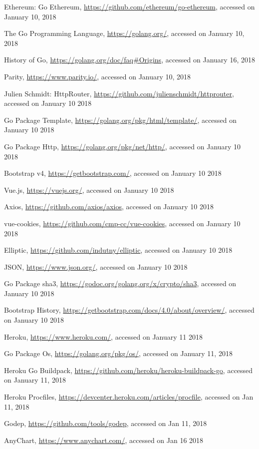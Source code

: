 \begin{thebibliography}{99}
 Ethereum: Go Ethereum, \url{https://github.com/ethereum/go-ethereum}, accessed on January 10, 2018

 The Go Programming Language, \url{https://golang.org/}, accessed on January 10, 2018

 History of Go, \url{https://golang.org/doc/faq#Origins}, accessed on January 16, 2018

 Parity, \url{https://www.parity.io/}, accessed on January 10, 2018

 Julien Schmidt: HttpRouter, \url{https://github.com/julienschmidt/httprouter}, accessed on January 10 2018

 Go Package Template, \url{https://golang.org/pkg/html/template/}, accessed on January 10 2018

 Go Package Http, \url{https://golang.org/pkg/net/http/}, accessed on January 10 2018

 Bootstrap v4, \url{https://getbootstrap.com/}, accessed on January 10 2018

 Vue.js, \url{https://vuejs.org/}, accessed on January 10 2018

 Axios, \url{https://github.com/axios/axios}, accessed on January 10 2018

 vue-cookies, \url{https://github.com/cmp-cc/vue-cookies}, accessed on January 10 2018

 Elliptic, \url{https://github.com/indutny/elliptic}, accessed on January 10 2018

 JSON, \url{https://www.json.org/}, accessed on January 10 2018

 Go Package sha3, \url{https://godoc.org/golang.org/x/crypto/sha3}, accessed on January 10 2018

 Bootstrap History, \url{https://getbootstrap.com/docs/4.0/about/overview/}, accessed on January 10 2018

 Heroku, \url{https://www.heroku.com/}, accessed on January 11 2018

 Go Package Os, \url{https://golang.org/pkg/os/}, accessed on January 11, 2018

 Heroku Go Buildpack, \url{https://github.com/heroku/heroku-buildpack-go}, accessed on January 11, 2018

 Heroku Procfiles, \url{https://devcenter.heroku.com/articles/procfile}, accessed on Jan 11, 2018

 Godep, \url{https://github.com/tools/godep}, accessed on Jan 11, 2018

 AnyChart, \url{https://www.anychart.com/}, accessed on Jan 16 2018

\end{thebibliography}

